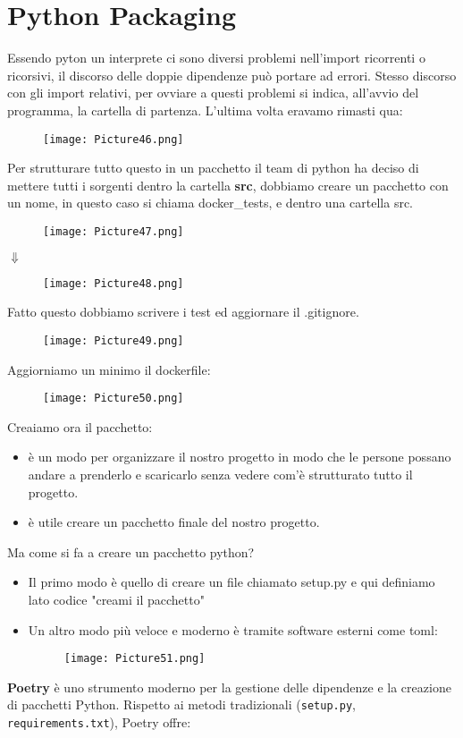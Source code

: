 \documentclass[a4paper,12pt]{article}
\begin{document}
\newpage
\section{Python Packaging}
Essendo pyton un interprete ci sono diversi problemi nell'import ricorrenti o ricorsivi, il discorso delle doppie dipendenze può portare ad errori. Stesso discorso con gli import relativi, per ovviare a questi problemi si indica, all'avvio del programma, la cartella di partenza.
\newline
L'ultima volta eravamo rimasti qua:
\begin{figure}[H]
    \centering
    \texttt{[image: Picture46.png]}
\end{figure}
\noindent Per strutturare tutto questo in un pacchetto il team di python ha deciso di mettere tutti i sorgenti dentro la cartella \textbf{src}, dobbiamo creare un pacchetto con un nome, in questo caso si chiama docker\_tests, e dentro una cartella src. 
\begin{figure}[H]
    \centering
    \texttt{[image: Picture47.png]}
\end{figure}
\begin{center}
    $\Downarrow$
\end{center}
\begin{figure}[H]
    \centering
    \texttt{[image: Picture48.png]}
\end{figure}
\noindent Fatto questo dobbiamo scrivere i test ed aggiornare il .gitignore.
\begin{figure}[H]
    \centering
    \texttt{[image: Picture49.png]}
\end{figure}
\noindent Aggiorniamo un minimo il dockerfile:
\begin{figure}[H]
    \centering
    \texttt{[image: Picture50.png]}
\end{figure}
\noindent Creaiamo ora il pacchetto:
\begin{itemize}
    \item è un modo per organizzare il nostro progetto in modo che le persone possano andare a prenderlo e scaricarlo senza vedere com'è strutturato tutto il progetto.
    \item è utile creare un pacchetto finale del nostro progetto.
\end{itemize}
Ma come si fa a creare un pacchetto python?
\begin{itemize}
    \item Il primo modo è quello di creare un file chiamato setup.py e qui definiamo lato codice "creami il pacchetto"
    \item Un altro modo più veloce e moderno è tramite software esterni come toml:
    \begin{figure}[H]
        \centering
        \texttt{[image: Picture51.png]}
    \end{figure}
\end{itemize}
\textbf{Poetry} è uno strumento moderno per la gestione delle dipendenze e la creazione di pacchetti Python. Rispetto ai metodi tradizionali (\texttt{setup.py}, \texttt{requirements.txt}), Poetry offre:
\end{document}
